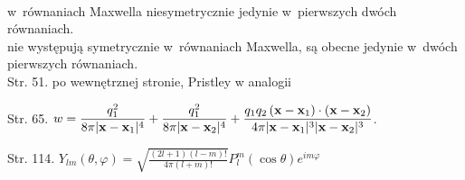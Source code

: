 \documentclass[a4paper,11pt]{article}
\begin{document}
\noindent
{} \\
\Jest  w~równaniach Maxwella niesymetrycznie jedynie w~pierwszych dwóch
równaniach. \\
\Powin nie występują symetrycznie w~równaniach Maxwella, są obecne jedynie
w~dwóch pierwszych równaniach. \\

Str. 51. po wewnętrznej stronie, Pristley w analogii

Str. 65. $\displaystyle w = \frac{ q^{ 2 }_{ 1 } }{ 8 \pi | \mathbf{x} - \mathbf{x}_{ 1 } |^{ 4 } } + \frac{ q^{ 2 }_{ 1 } }{ 8 \pi | \mathbf{x} - \mathbf{x}_{ 2 } |^{ 4 } } + \frac{ q_{ 1 } q_{ 2 } \, ( \mathbf{x} - \mathbf{x}_{ 1 } ) \cdot ( \mathbf{x} - \mathbf{x}_{ 2 } ) }{ 4 \pi | \mathbf{x} - \mathbf{x}_{ 1 } |^{ 3 } | \mathbf{x} - \mathbf{x}_{ 2 } |^{ 3 } }$.

Str. 114. $\displaystyle Y_{ l m }( \theta, \varphi ) = \sqrt{ \frac{ ( 2l + 1 ) ( l - m )! }{ 4 \pi ( l + m )! } } P^{ m }_{ l }( \cos \theta ) e^{ i m \varphi }$

\vspace{\spaceTwo}























{}






\end{document}
